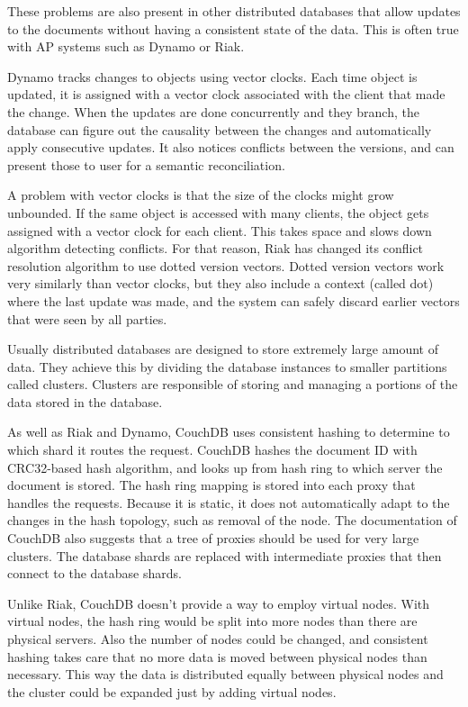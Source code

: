 These problems are also present in other distributed databases that allow
updates to the documents without having a consistent state of the data. This is
often true with AP systems such as Dynamo or Riak.

Dynamo tracks changes to objects using vector clocks. Each time object is
updated, it is assigned with a vector clock associated with the client that made
the change. When the updates are done concurrently and they branch, the database
can figure out the causality between the changes and automatically apply
consecutive updates. It also notices conflicts between the versions, and can
present those to user for a semantic reconciliation.

A problem with vector clocks is that the size of the clocks might grow
unbounded. If the same object is accessed with many clients, the object gets
assigned with a vector clock for each client. This takes space and slows down
algorithm detecting conflicts. For that reason, Riak has changed its conflict
resolution algorithm to use dotted version vectors\cite{preguicca2010dotted}.
Dotted version vectors work very similarly than vector clocks, but they also
include a context (called dot) where the last update was made, and the system
can safely discard earlier vectors that were seen by all parties.

Usually distributed databases are designed to store extremely large amount of
data. They achieve this by dividing the database instances to smaller partitions
called clusters. Clusters are responsible of storing and managing a portions of
the data stored in the database.

As well as Riak and Dynamo, CouchDB uses consistent hashing to determine to
which shard it routes the request. CouchDB hashes the document ID with
CRC32-based hash algorithm, and looks up from hash ring to which server the
document is stored. The hash ring mapping is stored into each proxy that handles
the requests. Because it is static, it does not automatically adapt to the
changes in the hash topology, such as removal of the node. The documentation of
CouchDB also suggests that a tree of proxies should be used for very large
clusters. The database shards are replaced with intermediate proxies that
then connect to the database shards.

Unlike Riak, CouchDB doesn't provide a way to employ virtual nodes. With virtual
nodes, the hash ring would be split into more nodes than there are physical
servers. Also the number of nodes could be changed, and consistent hashing takes
care that no more data is moved between physical nodes than necessary. This way
the data is distributed equally between physical nodes and the cluster could be
expanded just by adding virtual nodes.

